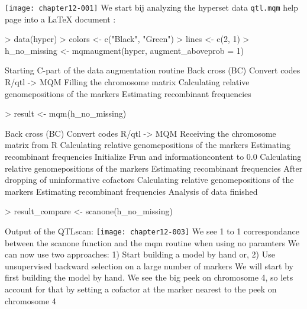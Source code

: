 \documentclass[a4paper]{article}
\begin{document}
\texttt{[image: chapter12-001]}
We start bij analyzing the hyperset data
\texttt{qtl.mqm} help page into a \LaTeX{} document :
\begin{Schunk}
\begin{Sinput}
> data(hyper)
> colors <- c("Black", "Green")
> lines <- c(2, 1)
> h_no_missing <- mqmaugment(hyper, augment_aboveprob = 1)
\end{Sinput}
\begin{Soutput}
Starting C-part of the data augmentation routine
Back cross (BC)
Convert codes R/qtl -> MQM
Filling the chromosome matrix
Calculating relative genomepositions of the markers
Estimating recombinant frequencies
\end{Soutput}
\begin{Sinput}
> result <- mqm(h_no_missing)
\end{Sinput}
\begin{Soutput}
Back cross (BC)
Convert codes R/qtl -> MQM
Receiving the chromosome matrix from R
Calculating relative genomepositions of the markers
Estimating recombinant frequencies
Initialize Frun and informationcontent to 0.0
Calculating relative genomepositions of the markers
Estimating recombinant frequencies
After dropping of uninformative cofactors
Calculating relative genomepositions of the markers
Estimating recombinant frequencies
Analysis of data finished
\end{Soutput}
\begin{Sinput}
> result_compare <- scanone(h_no_missing)
\end{Sinput}
\end{Schunk}
Output of the QTLscan:
\texttt{[image: chapter12-003]}
We see 1 to 1 correspondance between the scanone function and the mqm routine when using no paramters
We can now use two approaches:
1) Start building a model by hand or,
2) Use unsupervised backward selection on a large number of markers
We will start by first building the model by hand. We see the big peek on chromosome 4,
so lets account for that by setting a cofactor at the marker nearest to the peek on chromosome 4
\end{document}
